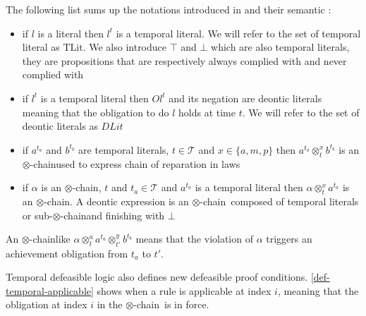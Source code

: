 \documentclass[10pt]{report}
\newcommand{\ochain}{$\otimes$-chain}
\begin{document}
The following list sums up the notations introduced in \autocite{JusticeDelayed2011} and their semantic :
\begin{itemize}
\item if $l$ is a literal then $l^{t}$ is a temporal literal. We will refer to the set of temporal literal as $\text{TLit}$. We also introduce $\top$ and $\bot$ which are also temporal literals, they are propositions that are respectively always complied with and never complied with
\item if $l^{t}$ is a temporal literal then $Ol^{t}$ and its negation are deontic literals meaning that the obligation to do $l$ holds at time $t$. We will refer to the set of deontic literals as $DLit$
\item if $a^{t_{a}}$ and $b^{t_{b}}$ are temporal literals, $t \in \mathscr{T}$ and $x \in \{a,m,p\}$ then $a^{t_{a}} \otimes^{x}_{t} b^{t_{b}}$ is an \ochain used to express chain of reparation in laws
\item if $\alpha$ is an \ochain, $t$ and $t_a \in \mathscr{T}$  and $a^{t_{a}}$ is a temporal literal then $\alpha \otimes^x_t a^{t_{a}}$ is an \ochain . A deontic expression is an \ochain\ composed of temporal literals or sub-\ochain and finishing with $\bot$
\end{itemize} 


An \ochain like $\alpha \otimes^{a}_{t} a^{t_{a}} \otimes^{y}_{t'} b^{t_{b}}$ means that the violation of $\alpha$ triggers an achievement obligation from $t_{a}$ to $t'$.

Temporal defeasible logic also defines new defeasible proof conditions. \ref{def-temporal-applicable} shows when a rule is applicable at index $i$, meaning that the obligation at index $i$ in the \ochain\ is in force.
\end{document}
